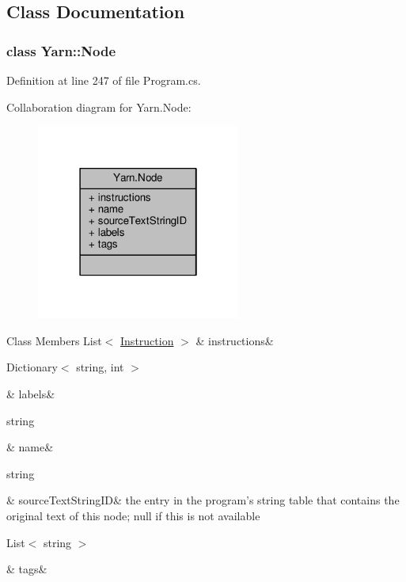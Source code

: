 \subsection{Class Documentation}
\label{a00379}
\hypertarget{a00051_a00379}{}
\subsubsection{class Yarn\-:\-:Node}


Definition at line 247 of file Program.\-cs.



Collaboration diagram for Yarn.\-Node\-:
\nopagebreak
\begin{figure}[H]
\begin{center}
\leavevmode
\includegraphics[width=190pt]{a00393}
\end{center}
\end{figure}
\begin{DoxyFields}{Class Members}
\hypertarget{a00051_a156723a9252b62d288ddf611939ea7c3}{List$<$ \hyperlink{a00119}{Instruction} $>$}\label{a00051_a156723a9252b62d288ddf611939ea7c3}
&
instructions&
\\
\hline

\hypertarget{a00051_a9afa49f4fbc72e806a0210cb4198f12e}{Dictionary$<$ string, int $>$}\label{a00051_a9afa49f4fbc72e806a0210cb4198f12e}
&
labels&
\\
\hline

\hypertarget{a00051_a107b0de3fcfc65e99913edc01b5ce9db}{string}\label{a00051_a107b0de3fcfc65e99913edc01b5ce9db}
&
name&
\\
\hline

\hypertarget{a00051_a09c6af5b50925d0876283b84281b3ed4}{string}\label{a00051_a09c6af5b50925d0876283b84281b3ed4}
&
source\-Text\-String\-I\-D&
the entry in the program's string table that contains the original text of this node; null if this is not available \\
\hline

\hypertarget{a00051_a811086feceebbe79a74eba071c1d516b}{List$<$ string $>$}\label{a00051_a811086feceebbe79a74eba071c1d516b}
&
tags&
\\
\hline

\end{DoxyFields}
